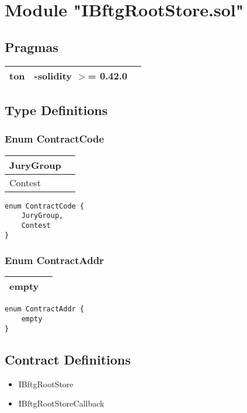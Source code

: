 
\section{Module "IBftgRootStore.sol"}


\subsection{Pragmas}


\noindent\begin{tabular}{|l|l|p{5cm}|}\hline
ton & -solidity $>$= 0.42.0 &\\\hline
\end{tabular}


\subsection{Type Definitions}


\subsubsection{Enum ContractCode}


\ifsoltables
\noindent\begin{tabular}{|l|p{6cm}|}\hline
JuryGroup & \\\hline
Contest & \\\hline
\end{tabular}
\fi


\begin{lstlisting}[firstnumber=3]
enum ContractCode {
    JuryGroup,
    Contest
}
\end{lstlisting}

\subsubsection{Enum ContractAddr}


\ifsoltables
\noindent\begin{tabular}{|l|p{6cm}|}\hline
empty & \\\hline
\end{tabular}
\fi


\begin{lstlisting}[firstnumber=8]
enum ContractAddr {
    empty
}
\end{lstlisting}

\subsection{Contract Definitions}

\begin{itemize}
\item IBftgRootStore
\item IBftgRootStoreCallback
\end{itemize}
